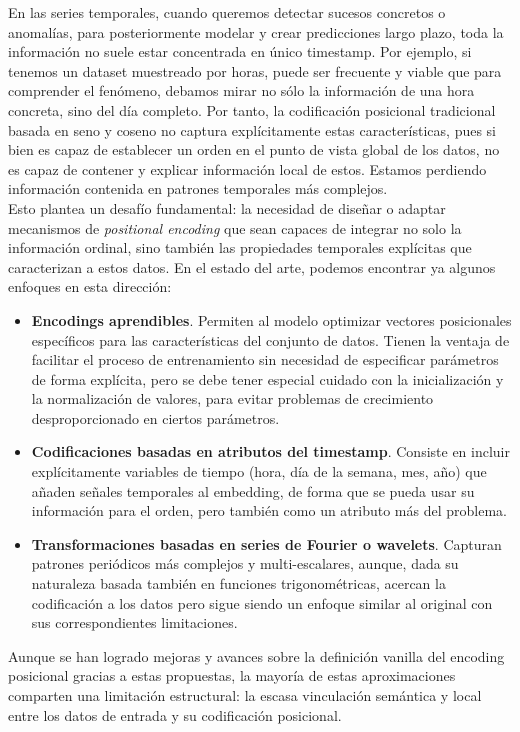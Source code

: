 En las series temporales, cuando queremos detectar sucesos concretos o anomalías, para posteriormente modelar y crear predicciones largo plazo, toda la información no suele estar concentrada en único timestamp. Por ejemplo, si tenemos un dataset muestreado por horas, puede ser frecuente y viable que para comprender el fenómeno, debamos mirar no sólo la información de una hora concreta, sino del día completo. Por tanto, la codificación posicional tradicional basada en seno y coseno no captura explícitamente estas características, pues si bien es capaz de establecer un orden en el punto de vista global de los datos, no es capaz de contener y explicar información local de estos. Estamos perdiendo información contenida en patrones temporales más complejos.\\

Esto plantea un desafío fundamental: la necesidad de diseñar o adaptar mecanismos de \textit{positional encoding} que sean capaces de integrar no solo la información ordinal, sino también las propiedades temporales explícitas que caracterizan a estos datos. En el estado del arte, podemos encontrar ya algunos enfoques en esta dirección:

\begin{itemize}
    \item \textbf{Encodings aprendibles}. Permiten al modelo optimizar vectores posicionales específicos para las características del conjunto de datos. Tienen la ventaja de facilitar el proceso de entrenamiento sin necesidad de especificar parámetros de forma explícita, pero se debe tener especial cuidado con la inicialización y la normalización de valores, para evitar problemas de crecimiento desproporcionado en ciertos parámetros.
    \item \textbf{Codificaciones basadas en atributos del timestamp}. Consiste en incluir explícitamente variables de tiempo (hora, día de la semana, mes, año) que añaden señales temporales al embedding, de forma que se pueda usar su información para el orden, pero también como un atributo más del problema.
    \item \textbf{Transformaciones basadas en series de Fourier o wavelets}. Capturan patrones periódicos más complejos y multi-escalares, aunque, dada su naturaleza basada también en funciones trigonométricas, acercan la codificación a los datos pero sigue siendo un enfoque similar al original con sus correspondientes limitaciones.
\end{itemize}

Aunque se han logrado mejoras y avances sobre la definición vanilla del encoding posicional gracias a estas propuestas, la mayoría de estas aproximaciones comparten una limitación estructural: la escasa vinculación semántica y local entre los datos de entrada y su codificación posicional.\\

